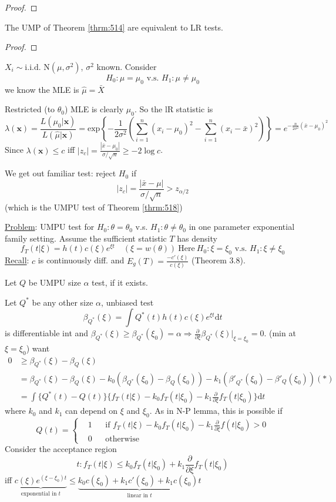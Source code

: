 \documentclass[english, 11pt]{article}
\begin{document}
\begin{proof}
\end{proof}

\begin{cor}\label{cor:521}
The UMP of Theorem \ref{thrm:514} are equivalent to LR tests.
\end{cor}
\begin{proof}
\end{proof}
\begin{exmp}
$X_i\sim\text{i.i.d. N}(\mu, \sigma^2)$, $\sigma^2$ known. Consider
$$
H_0:\mu=\mu_0\text{ v.s. }H_1:\mu\not=\mu_0
$$
we know the MLE is $\hat{\mu}=\bar{X}$
\end{exmp}


Restricted (to $\theta_0$) MLE is clearly $\mu_0$. So the lR statistic is 
$$
\lambda(\bm{x})=\frac{L(\mu_0|\bm{x})}{L(\hat{\mu}|\bm{x})}=\text{exp}\left\{-\frac{1}{2\sigma^2}\left(\sum_{i=1}^n(x_i-\mu_0)^2-\sum_{i=1}^n(x_i-\bar{x})^2\right)\right\}=e^{-\frac{n}{2\sigma^2}(\bar{x}-\mu_0)^2}
$$
Since $\lambda(\bm{x})\leqslant c$ iff $|z_c|=\frac{|\bar{x}-\mu_0|}{\sigma/\sqrt{n}}\geqslant-2\log c$.

We get out familiar test: reject $H_0$ if 
$$
|z_c|=\frac{|\bar{x}-\mu|}{\sigma/\sqrt{n}}>z_{\alpha/2}
$$
(which is the UMPU test of Theorem \ref{thrm:518})

\underline{Problem}: UMPU test for $H_0:\theta=\theta_0$ v.s. $H_1:\theta\not=\theta_0$ in one parameter exponential family setting. Assume the sufficient statistic $T$ has density
$$
f_T(t|\xi)=h(t)c(\xi)e^{\xi t}\quad(\xi=w(\theta))\ \text{Here}\ H_0:\xi=\xi_0\text{ v.s. }H_1:\xi\not=\xi_0
$$
\underline{Recall}: $c$ is continuously diff. and $E_g(T)=\frac{-c'(\xi)}{c(\xi)}$ (Theorem 3.8). 

Let $Q$ be UMPU size $\alpha$ test, if it exists.

Let $Q^*$ be any other size $\alpha$, unbiased test
$$
\beta_{Q^*}(\xi)=\int Q^*(t)h(t)c(\xi)e^{\xi t}\mathrm{d}t
$$
is differentiable int and $\beta_{Q^*}(\xi)\geqslant\beta_{Q^*}(\xi_0)=\alpha\Rightarrow\frac{\partial}{\partial\xi}\beta_{Q^*}(\xi)\big|_{\xi=\xi_0}=0$. (min at $\xi=\xi_0$)
want 
$$
\begin{aligned}
0&\geqslant\beta_{Q^*}(\xi)-\beta_Q(\xi)\\
&=\beta_{Q^*}(\xi)-\beta_Q(\xi)-k_0(\beta_{Q^*}(\xi_0)-\beta_Q(\xi_0))-k_1(\beta'_{Q^*}(\xi_0)-\beta'_{Q}(\xi_0)) (*)\\
&=\int\{Q^*(t)-Q(t)\}\{f_T(t|\xi)-k_0f_T(t|\xi_0)-k_1\frac{\partial}{\partial\xi}f_T(t|\xi_0)\}\mathrm{d}t
\end{aligned}
$$
where $k_0$ and $k_1$ can depend on $\xi$ and $\xi_0$. As in N-P lemma, this is possible if 
$$
Q(t)=\left\{\begin{aligned}&1 & & \text{if } f_T(t|\xi)-k_0f_T(t|\xi_0)-k_1\frac{\partial}{\partial\xi}f(t|\xi_0)>0\\
&0 & &\text{otherwise}
\end{aligned}\right.
$$
Consider the acceptance region
$$
t:f_T(t|\xi)\leqslant k_0f_T(t|\xi_0)+k_1\frac{\partial}{\partial \xi}f_T(t|\xi_0)
$$
iff $\underbrace{c(\xi)e^{(\xi-\xi_0)t}}_{\text{exponential in }t}\leqslant \underbrace{k_0c(\xi_0)+k_1c'(\xi_0)+k_1c(\xi_0)t}_{\text{linear in }t}$
\end{document}
